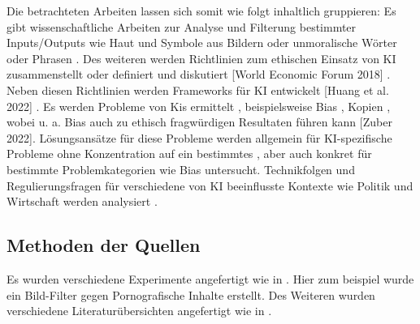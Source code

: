 Die betrachteten Arbeiten lassen sich somit wie folgt inhaltlich gruppieren: Es gibt wissenschaftliche Arbeiten zur Analyse und Filterung
bestimmter Inputs/Outputs wie Haut und Symbole aus Bildern \cite{Zheng} oder unmoralische Wörter oder Phrasen \cite{Shah}. Des weiteren 
werden Richtlinien zum ethischen Einsatz von KI zusammenstellt oder definiert und diskutiert \cite{Ayling} \cite{Srinivasan} 
\cite{Jameel} \cite{Hagendorff} \cite{Jobin} \cite{Unity} \cite{EUCommision}[World Economic Forum 2018] \cite{Mueller}.
Neben diesen Richtlinien werden Frameworks für KI entwickelt [Huang et al. 2022] \cite{Mueller}. Es werden Probleme von Kis ermittelt \cite{Ayling}, 
beispielsweise Bias \cite{Salminen} \cite{Jameel}, Kopien \cite{Somepalli}, wobei u. a. Bias auch zu ethisch 
fragwürdigen Resultaten führen kann [Zuber 2022]. Lösungsansätze für diese Probleme werden allgemein für KI-spezifische Probleme ohne 
Konzentration auf ein bestimmtes \cite{Ayling} \cite{Avelar}, aber auch konkret für bestimmte Problemkategorien wie Bias \cite{Srinivasan}
\cite{Jameel}untersucht. Technikfolgen und Regulierungsfragen für verschiedene von KI beeinflusste Kontexte wie Politik und Wirtschaft
werden analysiert \cite{Pawelec}.

\subsection{Methoden der Quellen}
Es wurden verschiedene Experimente angefertigt wie in \cite{Zheng}. Hier zum beispiel wurde ein Bild-Filter gegen Pornografische Inhalte erstellt.
Des Weiteren wurden verschiedene Literaturübersichten angefertigt wie in \cite{Srinivasan}.  